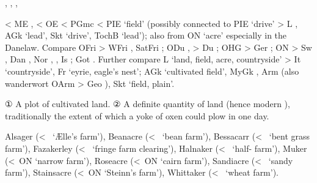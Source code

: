 \documentclass[12pt,letterpaper,oneside,article,draft]{memoir}
\begin{document}
\begin{Lemma}
\begin{Also}
	, , , 
\end{Also}
\begin{Etymology}
	< ME ,  < OE  < PGmc  < PIE  ‘field’
		(possibly connected to PIE  ‘drive’ > L , 	AGk   ‘lead’,
		Skt   ‘drive’, TochB  ‘lead’);
		also from ON  ‘acre’ especially in the Danelaw.
	Compare
	OFri  >  WFri , SatFri ;
	ODu ,  > Du ;
	OHG  > Ger ;
	ON  > Sw , Dan , Nor , , Is ;
	Got  .
	Further compare
	L  ‘land, field, acre, countryside’ > It  ‘countryside’, Fr  ‘eyrie, eagle’s nest’;
	AGk   ‘cultivated field’, MyGk  ,
	Arm   (also wanderwort OArm  
	> Geo  ), Skt   ‘field, plain’.
\end{Etymology}
\begin{Definitions}
	① A plot of cultivated land.
	② A definite quantity of land (hence modern ), traditionally the extent of which a yoke of oxen could plow in one day.
\end{Definitions}
\begin{Examples}
	Alsager (<~ ‘Ælle’s farm’), Beanacre (<~ ‘bean farm’), Bessacarr (<~ ‘bent grass farm’), Fazakerley (<~ ‘fringe farm clearing’), Halnaker (<~ ‘half- farm’), Muker (<~ON  ‘narrow farm’), Roseacre (<~ON  ‘cairn farm’), Sandiacre (<~ ‘sandy farm’), Stainsacre (<~ON  ‘Steinn’s farm’), Whittaker (<~ ‘wheat farm’).
\end{Examples}
\end{Lemma}
\end{document}
